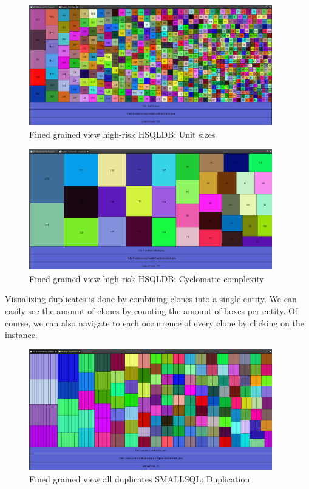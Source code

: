\documentclass{article}
\begin{document}
\begin{figure}[!htbp]
	\centering
	\label{fig:unit-sizes}
	\caption{Fined grained view high-risk HSQLDB: Unit sizes}
	\includegraphics[width=400px, height=200px]{hsqldb_unitsizes.png}
\end{figure}

\begin{figure}[!htbp]
	\centering
	\label{fig:cyclomatic-complexity}
	\caption{Fined grained view high-risk HSQLDB: Cyclomatic complexity}
	\includegraphics[width=400px, height=200px]{hsqldb_coc.png}
\end{figure}

\clearpage 

Visualizing duplicates is done by combining clones into a single entity. 
We can easily see the amount of clones by counting the amount of boxes per entity.
Of course, we can also navigate to each occurrence of every clone by clicking on the instance.

\begin{figure}[!htbp]
	\centering
	\label{fig:duplication}
	\caption{Fined grained view all duplicates SMALLSQL: Duplication}
	\includegraphics[width=400px, height=200px]{smallsql_duplication.png}
\end{figure}
\end{document}
